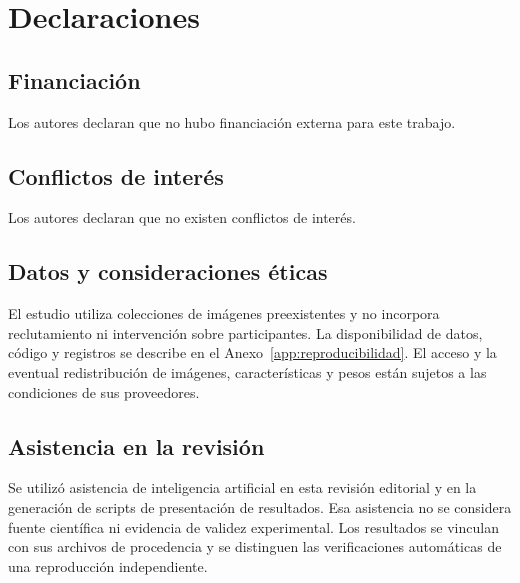 \chapter*{Declaraciones}

\section*{Financiación}
Los autores declaran que no hubo financiación externa para este trabajo.

\section*{Conflictos de interés}
Los autores declaran que no existen conflictos de interés.

\section*{Datos y consideraciones éticas}
El estudio utiliza colecciones de imágenes preexistentes y no incorpora reclutamiento ni intervención sobre participantes. La disponibilidad de datos, código y registros se describe en el Anexo~\ref{app:reproducibilidad}. El acceso y la eventual redistribución de imágenes, características y pesos están sujetos a las condiciones de sus proveedores.

\section*{Asistencia en la revisión}
Se utilizó asistencia de inteligencia artificial en esta revisión editorial y en la generación de scripts de presentación de resultados. Esa asistencia no se considera fuente científica ni evidencia de validez experimental. Los resultados se vinculan con sus archivos de procedencia y se distinguen las verificaciones automáticas de una reproducción independiente.
